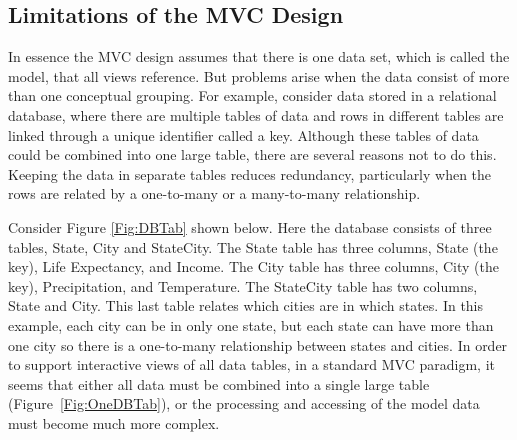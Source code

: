 \documentclass{article}[11pt]
\newcommand{\Rpackage}[1]{{\textit{#1}}}
\begin{document}

\subsection{Limitations of the MVC Design}\label{Ssec:Limit}

In essence the MVC design assumes that there is one data set, which is
called the model, that all views reference.  But problems arise when
the data consist of more than one conceptual grouping.  For example,
consider data stored in a relational database, where there are
multiple tables of data and rows in different tables are linked
through a unique identifier called a key.  Although these tables of
data could be combined into one large table, there are several reasons
not to do this.  Keeping the data in separate tables reduces
redundancy, particularly when the rows are related by a one-to-many or
a many-to-many relationship.


Consider Figure \ref{Fig:DBTab} shown below.  Here the database
consists of three tables, State, City and StateCity.  The State table
has three columns, State (the key), Life Expectancy, and Income.  The
City table has three columns, City (the key), Precipitation, and
Temperature.  The StateCity table has two columns, State and City.
This last table relates which cities are in which states.  In this
example, each city can be in only one state, but each state can have
more than one city so there is a one-to-many relationship between
states and cities.  In order to support interactive views of all data
tables, in a standard MVC paradigm, it seems that either all data must
be combined into a single large table (Figure~\ref{Fig:OneDBTab}), or
the processing and accessing of the model data must become much more
complex. 
\end{document}
